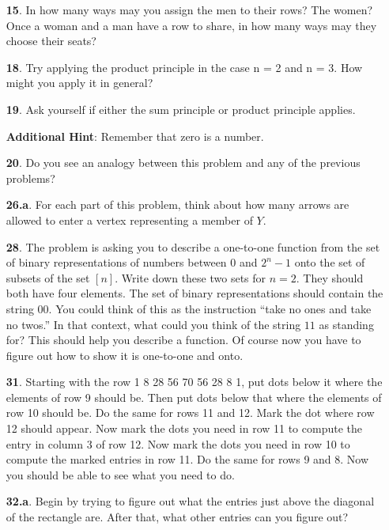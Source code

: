 \documentclass[10pt,]{book}
\theoremstyle{plain}
\theoremstyle{definition}
\theoremstyle{definition}
\numberwithin{equation}{chapter}
\begin{document}
\begin{itemize}[itemsep=1em]
\item[\textbf{15}.]In how many ways may you assign the men to their rows? The women? Once a woman and a man have a row to share, in how many ways may they choose their seats?%

\item[\textbf{18}.]Try applying the product principle in the case n = 2 and n = 3. How might you apply it in general?%

\item[\textbf{19}.]Ask yourself if either the sum principle or product principle applies.%

\par\smallskip
\noindent\textbf{Additional Hint}: Remember that zero is a number.%

\item[\textbf{20}.]Do you see an analogy between this problem and any of the previous problems?%

\item[\textbf{26.a}.]For each part of this problem, think about how many arrows are allowed to enter a vertex representing a member of \(Y\).%

\item[\textbf{28}.]The problem is asking you to describe a one-to-one function from the set of binary representations of numbers between \(0\) and \(2^n-1\) onto the set of subsets of the set \([n]\). Write down these two sets for \(n = 2\). They should both have four elements. The set of binary representations should contain the string \(00\). You could think of this as the instruction ``take no ones and take no twos.'' In that context, what could you think of the string \(11\) as standing for? This should help you describe a function. Of course now you have to figure out how to show it is one-to-one and onto.%

\item[\textbf{31}.]Starting with the row 1 8 28 56 70 56 28 8 1, put dots below it where the elements of row 9 should be. Then put dots below that where the elements of row 10 should be. Do the same for rows 11 and 12. Mark the dot where row 12 should appear. Now mark the dots you need in row 11 to compute the entry in column 3 of row 12. Now mark the dots you need in row 10 to compute the marked entries in row 11. Do the same for rows 9 and 8. Now you should be able to see what you need to do.%

\item[\textbf{32.a}.]Begin by trying to figure out what the entries just above the diagonal of the rectangle are. After that, what other entries can you figure out?%


\end{itemize}
\end{document}
